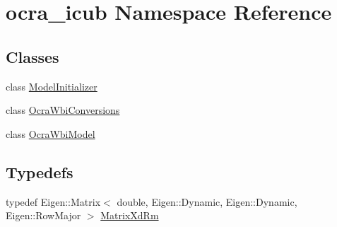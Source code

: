 \hypertarget{namespaceocra__icub}{}\section{ocra\+\_\+icub Namespace Reference}
\label{namespaceocra__icub}
\subsection*{Classes}
\begin{DoxyCompactItemize}
\item 
class \hyperlink{classocra__icub_1_1ModelInitializer}{Model\+Initializer}
\item 
class \hyperlink{classocra__icub_1_1OcraWbiConversions}{Ocra\+Wbi\+Conversions}
\item 
class \hyperlink{classocra__icub_1_1OcraWbiModel}{Ocra\+Wbi\+Model}
\end{DoxyCompactItemize}
\subsection*{Typedefs}
\begin{DoxyCompactItemize}
\item 
typedef Eigen\+::\+Matrix$<$ double, Eigen\+::\+Dynamic, Eigen\+::\+Dynamic, Eigen\+::\+Row\+Major $>$ \hyperlink{namespaceocra__icub_aa5e36a19ed031c28ca83c207bd7dd83f}{Matrix\+Xd\+Rm}
\end{DoxyCompactItemize}
